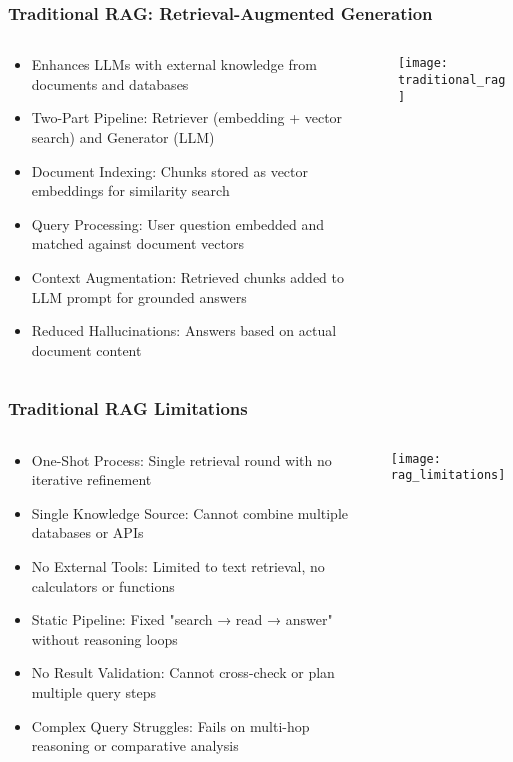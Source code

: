 \begin{frame}[fragile]\frametitle{Traditional RAG: Retrieval-Augmented Generation}
\begin{columns}
    \begin{column}[T]{0.6\linewidth}
      \begin{itemize}
		\item Enhances LLMs with external knowledge from documents and databases
		\item Two-Part Pipeline: Retriever (embedding + vector search) and Generator (LLM)
		\item Document Indexing: Chunks stored as vector embeddings for similarity search
		\item Query Processing: User question embedded and matched against document vectors
		\item Context Augmentation: Retrieved chunks added to LLM prompt for grounded answers
		\item Reduced Hallucinations: Answers based on actual document content
	  \end{itemize}
    \end{column}
    \begin{column}[T]{0.4\linewidth}
		\begin{center}
		\texttt{[image: traditional\_rag]}
		\end{center}	
    \end{column}
  \end{columns}
\end{frame}

\begin{frame}[fragile]\frametitle{Traditional RAG Limitations}
\begin{columns}
    \begin{column}[T]{0.6\linewidth}
      \begin{itemize}
		\item One-Shot Process: Single retrieval round with no iterative refinement
		\item Single Knowledge Source: Cannot combine multiple databases or APIs
		\item No External Tools: Limited to text retrieval, no calculators or functions
		\item Static Pipeline: Fixed "search → read → answer" without reasoning loops
		\item No Result Validation: Cannot cross-check or plan multiple query steps
		\item Complex Query Struggles: Fails on multi-hop reasoning or comparative analysis
	  \end{itemize}
    \end{column}
    \begin{column}[T]{0.4\linewidth}
		\begin{center}
		\texttt{[image: rag\_limitations]}
		\end{center}	
    \end{column}
  \end{columns}
\end{frame}

